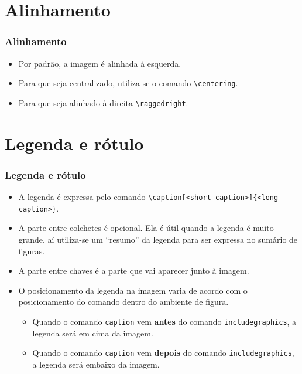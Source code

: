 \documentclass{beamer}
\begin{document}
\section{Alinhamento}

\begin{frame}[fragile]
    \frametitle{Alinhamento}

    \begin{itemize}
        \item Por padrão, a imagem é alinhada à esquerda.
        \item Para que seja centralizado, utiliza-se o comando \lstinline[style=myStyleLatex]!\centering!.
        \item Para que seja alinhado à direita \lstinline[style=myStyleLatex]!\raggedright!.
    \end{itemize}

\end{frame}

\section{Legenda e rótulo}
\begin{frame}[fragile]
    \frametitle{Legenda e rótulo}

    \begin{itemize}
        \item A legenda é expressa pelo comando \lstinline[style=myStyleLatex]!\caption[<short caption>]{<long caption>}!.
        \item A parte entre colchetes é opcional. Ela é útil quando a legenda é muito grande, aí utiliza-se um ``resumo'' da legenda para ser expressa no sumário de figuras.
        \item A parte entre chaves é a parte que vai aparecer junto à imagem.
        \item O posicionamento da legenda na imagem varia de acordo com o posicionamento do comando dentro do ambiente de figura.
              \begin{itemize}
                  \item Quando o comando \texttt{caption} vem \textbf{antes} do comando \texttt{includegraphics}, a legenda será em cima da imagem.
                  \item Quando o comando \texttt{caption} vem \textbf{depois} do comando \texttt{includegraphics}, a legenda será embaixo da imagem.
              \end{itemize}
    \end{itemize}

\end{frame}
\end{document}
